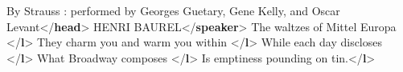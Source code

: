 \begin{shaded}
By Strauss : performed by Georges Guetary, Gene Kelly, and Oscar\mbox{}\newline 
\hspace*{1em}\hspace*{1em} Levant{</\textbf{head}>}\mbox{}\newline 
{}\mbox{}\newline 
\hspace*{1em}HENRI BAUREL{</\textbf{speaker}>}\mbox{}\newline 
\hspace*{1em}\mbox{}\newline 
\hspace*{1em}\hspace*{1em}The waltzes of Mittel Europa {</\textbf{l}>}\mbox{}\newline 
\hspace*{1em}\hspace*{1em}They charm you and warm you within {</\textbf{l}>}\mbox{}\newline 
\hspace*{1em}\hspace*{1em}While each day discloses {</\textbf{l}>}\mbox{}\newline 
\hspace*{1em}\hspace*{1em}What Broadway composes {</\textbf{l}>}\mbox{}\newline 
\hspace*{1em}\hspace*{1em}Is emptiness pounding on tin.{</\textbf{l}>}\mbox{}\newline 
\hspace*{1em}\mbox{}\newline 
{}\mbox{}\newline 
{}\mbox{}\newline 

\end{shaded}
